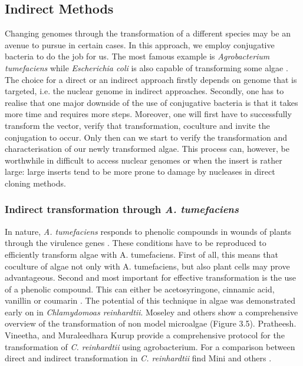 \subsection{Indirect Methods}
Changing genomes through the transformation of a different species may be an avenue to pursue in certain cases. In this approach, we employ conjugative bacteria to do the job for us. The most famous example is \textit{Agrobacterium tumefaciens} while \textit{Escherichia coli} is also capable of transforming some algae \parencite{Mosey2021}. The choice for a direct or an indirect approach firstly depends on genome that is targeted, i.e. the nuclear genome in indirect approaches. Secondly, one has to realise that one major downside of the use of conjugative bacteria is that it takes more time and requires more steps. Moreover, one will first have to successfully transform the vector, verify that transformation, coculture and invite the conjugation to occur. Only then can we start to verify the transformation and characterisation of our newly transformed algae. This process can, however, be worthwhile in difficult to access nuclear genomes or when the insert is rather large: large inserts tend to be more prone to damage by nucleases in direct cloning methods.

\subsubsection{Indirect transformation through \textit{A. tumefaciens}}
In nature, \textit{A. tumefaciens} responds to phenolic compounds in wounds of plants through the virulence genes \parencite{Gelvin2017}. These conditions have to be reproduced to efficiently transform algae with A. tumefaciens. First of all, this means that coculture of algae not only with A. tumefaciens, but also plant cells may prove advantageous. Second and most important for effective transformation is the use of a phenolic compound. This can either be acetosyringone, cinnamic acid, vanillin or coumarin \parencite{Mosey2021}. The potential of this technique in algae was demonstrated early on in \textit{Chlamydomoas reinhardtii}. Moseley and others show a comprehensive overview of the transformation of non model microalgae (Figure 3.5). Pratheesh. Vineetha, and Muraleedhara Kurup provide a comprehensive protocol for the transformation of \textit{C. reinhardtii} using agrobacterium. For a comparison between direct and indirect transformation in \textit{C. reinhardtii} find Mini and others \parencite{Pratheesh2013}.

